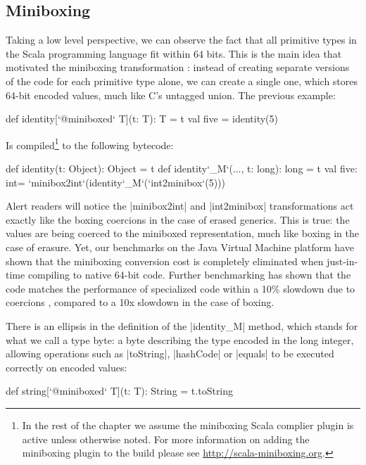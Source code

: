 \subsection{Miniboxing}

Taking a low level perspective, we can observe the fact that all primitive types in the Scala programming language fit within 64 bits. This is the main idea that motivated the miniboxing transformation \cite{miniboxing}: instead of creating separate versions of the code for each primitive type alone, we can create a single one, which stores 64-bit encoded values, much like C's untagged union. The previous example:

\begin{lstlisting-nobreak}
 def identity[`@miniboxed` T](t: T): T = t
 val five = identity(5)
\end{lstlisting-nobreak}

Is compiled\footnote{In the rest of the chapter we assume the miniboxing Scala complier plugin is active unless otherwise noted. For more information on adding the miniboxing plugin to the build please see \url{http://scala-miniboxing.org}.} to the following bytecode:

\begin{lstlisting-nobreak}
 def identity(t: Object): Object = t
 def identity`_M`(..., t: long): long = t
 val five: int= `minibox2int`(identity`_M`(`int2minibox`(5)))
\end{lstlisting-nobreak}

Alert readers will notice the |minibox2int| and |int2minibox| transformations act exactly like the boxing coercions in the case of erased generics. This is true: the values are being coerced to the miniboxed representation, much like boxing in the case of erasure. Yet, our benchmarks on the Java Virtual Machine platform have shown that the miniboxing conversion cost is completely eliminated when just-in-time compiling to native 64-bit code. Further benchmarking has shown that the code matches the performance of specialized code within a 10\% slowdown due to coercions \cite{miniboxing}, compared to a 10x slowdown in the case of boxing.

There is an ellipsis in the definition of the |identity_M| method, which stands for what we call a type byte: a byte describing the type encoded in the long integer, allowing operations such as |toString|, |hashCode| or |equals| to be executed correctly on encoded values:

\begin{lstlisting-nobreak}
 def string[`@miniboxed` T](t: T): String = t.toString
\end{lstlisting-nobreak}

